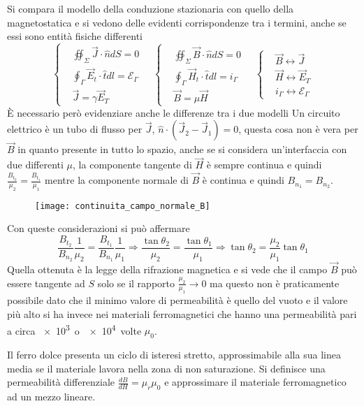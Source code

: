 Si compara il modello della conduzione stazionaria con quello della magnetostatica
e si vedono delle evidenti corrispondenze tra i termini, anche se essi sono entità fisiche 
differenti
$$
\left\{\begin{aligned}
&\oiint_\Sigma \vec{J}\cdot\hat{n}dS = 0\\
& \oint_\Gamma \vec{E}_t\cdot\hat{t}dl = \mathcal{E}_\Gamma \\
&\vec{J} = \gamma \vec{E}_T
\end{aligned}
\right.
\quad
\left\{\begin{aligned}
&\oiint_\Sigma \vec{B}\cdot\hat{n}dS = 0\\
& \oint_\Gamma \vec{H}_t\cdot\hat{t}dl = i_\Gamma \\
&\vec{B} = \mu \vec{H}
\end{aligned}
\right.
\quad
\left\{\begin{aligned}
&\vec{B} \leftrightarrow \vec{J}\\
&\vec{H} \leftrightarrow \vec{E}_T \\
& i_\Gamma \leftrightarrow \mathcal{E}_\Gamma
\end{aligned}
\right.
$$
È necessario però evidenziare anche le differenze tra i due modelli
Un circuito elettrico è un tubo di flusso per $\vec{J}$, 
$\hat{n}\cdot(\vec{J}_2-\vec{J}_1) = 0$, questa cosa non è vera per $\vec{B}$ in quanto
presente in tutto lo spazio, anche se si considera un'interfaccia con due differenti $\mu$,
la componente tangente di $\vec{H}$ è sempre continua e quindi $\frac{B_{t_2}}{\mu_2} = \frac{B_{t_1}}{\mu_1}$ mentre la componente normale di $\vec{B}$ è continua e quindi $B_{n_1} = B_{n_2}$.
\begin{figure}[H]
\centering
\texttt{[image: continuita\_campo\_normale\_B]}
\end{figure}
Con queste considerazioni si può affermare
$$
\frac{B_{t_2}}{B_{n_2}}\frac{1}{\mu_2} = \frac{B_{t_1}}{B_{n_1}}\frac{1}{\mu_1} \Rightarrow 
\frac{\tan \theta_2}{\mu_2} = \frac{\tan\theta_1}{\mu_1}\Rightarrow \tan\theta_2 = \frac{\mu_2}{\mu_1}\tan\theta_1
$$
Quella ottenuta è la legge della rifrazione magnetica e si vede che il campo $\vec{B}$ può
essere tangente ad $S$ solo se il rapporto $\frac{\mu_2}{\mu_1}\to 0$ ma questo non è 
praticamente possibile dato che il minimo valore di permeabilità è quello del vuoto
e il valore più alto si ha invece nei materiali ferromagnetici che hanno una permeabilità
pari a circa \SI{e3} o \SI{e4} volte $\mu_0$.
\newpage

Il ferro dolce presenta un ciclo di isteresi stretto, approssimabile alla sua
linea media se il materiale lavora nella zona di non saturazione. Si definisce una 
permeabilità differenziale $\frac{dB}{dH} = \mu_r\mu_0$ e approssimare il materiale
ferromagnetico ad un mezzo lineare.

